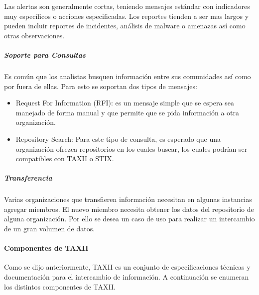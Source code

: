 Las alertas son generalmente cortas, teniendo mensajes estándar con indicadores 
muy específicos o acciones especificadas. Los reportes tienden a ser mas largos 
y pueden incluir reportes de incidentes, análisis de malware o amenazas así como 
otras observaciones.

\subparagraph{Soporte para Consultas}

Es común que los analistas busquen información entre sus comunidades así como 
por fuera de ellas. Para esto se soportan dos tipos de mensajes:
\begin{itemize}
  \item Request For Information (RFI): es un mensaje simple que se espera sea 
  manejado de forma manual y que permite que se pida información a otra 
  organización.
  \item Repository Search: Para este tipo de consulta, es esperado que una 
  organización ofrezca repositorios en los cuales buscar, los cuales podrían ser 
  compatibles con TAXII o STIX.
\end{itemize}

\subparagraph{Transferencia}

Varias organizaciones que transfieren información necesitan en algunas 
instancias agregar miembros. El nuevo miembro necesita obtener los datos del 
repositorio de alguna organización. Por ello se desea un caso de uso para 
realizar un intercambio de un gran volumen de datos.

\paragraph{Componentes de TAXII}

Como se dijo anteriormente, TAXII es un conjunto de especificaciones técnicas y 
documentación para el intercambio de información. A continuación se enumeran los 
distintos componentes de TAXII.

